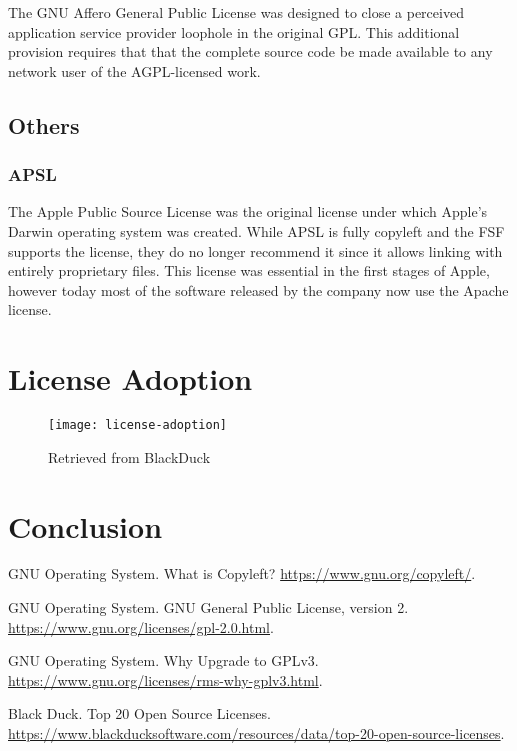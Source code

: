 \documentclass[12pt,letterpaper]{article}
\begin{document}
The GNU Affero General Public License was designed to close a perceived application service provider loophole in the original GPL. This additional provision requires that  that the complete source code be made available to any network user of the AGPL-licensed work.

\subsection{Others}

\subsubsection{APSL}

The Apple Public Source License was the original license under which Apple's Darwin operating system was created. While APSL is fully copyleft and the FSF supports the license, they do no longer recommend it since it allows linking with entirely proprietary files. This license was essential in the first stages of Apple, however today most of the software released by the company now use the Apache license.

\section{License Adoption}

\begin{figure}[h]
\begin{adjustwidth}{-1in}{-1in}
  \centering
  \texttt{[image: license-adoption]}
\end{adjustwidth}
  \caption[Top 20 Open Source Licenses]{Retrieved from BlackDuck \cite{license-stats}}
\end{figure}

\newpage

\section{Conclusion}

\newpage

\begin{thebibliography}{9}
 GNU Operating System. What is Copyleft? \url{https://www.gnu.org/copyleft/}.

 GNU Operating System. GNU General Public License, version 2. \url{https://www.gnu.org/licenses/gpl-2.0.html}.

 GNU Operating System. Why Upgrade to GPLv3. \url{https://www.gnu.org/licenses/rms-why-gplv3.html}.

 Black Duck. Top 20 Open Source Licenses. \url{https://www.blackducksoftware.com/resources/data/top-20-open-source-licenses}.

\end{thebibliography}





\end{document}
